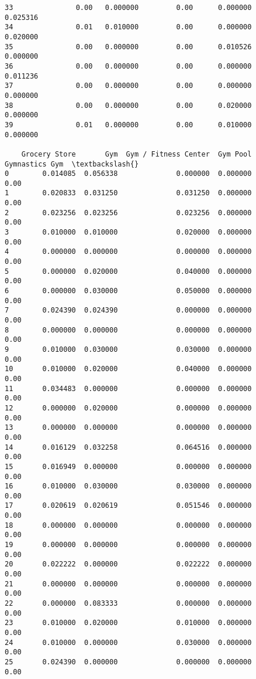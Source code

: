 \documentclass[11pt]{article}
\begin{document}
\begin{tcolorbox}[breakable, size=fbox, boxrule=.5pt, pad at break*=1mm, opacityfill=0]
\begin{Verbatim}[commandchars=\\\{\}]
33               0.00   0.000000         0.00      0.000000          0.025316
34               0.01   0.010000         0.00      0.000000          0.020000
35               0.00   0.000000         0.00      0.010526          0.000000
36               0.00   0.000000         0.00      0.000000          0.011236
37               0.00   0.000000         0.00      0.000000          0.000000
38               0.00   0.000000         0.00      0.020000          0.000000
39               0.01   0.000000         0.00      0.010000          0.000000

    Grocery Store       Gym  Gym / Fitness Center  Gym Pool  Gymnastics Gym  \textbackslash{}
0        0.014085  0.056338              0.000000  0.000000            0.00
1        0.020833  0.031250              0.031250  0.000000            0.00
2        0.023256  0.023256              0.023256  0.000000            0.00
3        0.010000  0.010000              0.020000  0.000000            0.00
4        0.000000  0.000000              0.000000  0.000000            0.00
5        0.000000  0.020000              0.040000  0.000000            0.00
6        0.000000  0.030000              0.050000  0.000000            0.00
7        0.024390  0.024390              0.000000  0.000000            0.00
8        0.000000  0.000000              0.000000  0.000000            0.00
9        0.010000  0.030000              0.030000  0.000000            0.00
10       0.010000  0.020000              0.040000  0.000000            0.00
11       0.034483  0.000000              0.000000  0.000000            0.00
12       0.000000  0.020000              0.000000  0.000000            0.00
13       0.000000  0.000000              0.000000  0.000000            0.00
14       0.016129  0.032258              0.064516  0.000000            0.00
15       0.016949  0.000000              0.000000  0.000000            0.00
16       0.010000  0.030000              0.030000  0.000000            0.00
17       0.020619  0.020619              0.051546  0.000000            0.00
18       0.000000  0.000000              0.000000  0.000000            0.00
19       0.000000  0.000000              0.000000  0.000000            0.00
20       0.022222  0.000000              0.022222  0.000000            0.00
21       0.000000  0.000000              0.000000  0.000000            0.00
22       0.000000  0.083333              0.000000  0.000000            0.00
23       0.010000  0.020000              0.010000  0.000000            0.00
24       0.010000  0.000000              0.030000  0.000000            0.00
25       0.024390  0.000000              0.000000  0.000000            0.00

\end{Verbatim}
\end{tcolorbox}
\end{document}
